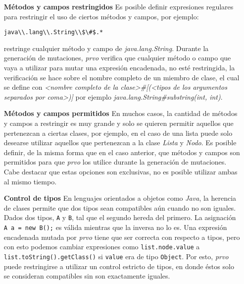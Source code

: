 \begin{enumerate}[leftmargin=.75cm,align=left]
	\item[\textbf{M\'etodos y campos restringidos}] Es posible definir expresiones regulares para restringir el uso de ciertos m\'etodos y campos, por ejemplo:
	\begin{lstlisting}[mathescape=true]
	java\\.lang\\.String\\$\#$.*
	\end{lstlisting}
	restringe cualquier m\'etodo y campo de \emph{java.lang.String}. Durante la generaci\'on de mutaciones, \emph{prvo} verifica que cualquier m\'etodo o campo que vaya a utilizar para mutar una expresi\'on encadenada, no est\'e restringida, la verificaci\'on se hace sobre el nombre completo de un miembro de clase, el cual se define con \emph{<nombre completo de la clase>\#<nombre del miembro>[(<tipos de los argumentos separados por coma>)]} por ejemplo \emph{java.lang.String\#substring(int, int)}.
	
	\item[\textbf{M\'etodos y campos permitidos}] En muchos casos, la cantidad de m\'etodos y campos a restringir es muy grande y solo se quieren permitir aquellos que pertenezcan a ciertas clases, por ejemplo, en el caso de una lista puede solo desearse utilizar aquellos que pertenezcan a la clase \emph{Lista} y \emph{Nodo}. Es posible definir, de la misma forma que en el caso anterior, que m\'etodos y campos son permitidos para que \emph{prvo} los utilice durante la generaci\'on de mutaciones. Cabe destacar que estas opciones son exclusivas, no es posible utilizar ambas al mismo tiempo.
	
	\item[\textbf{Control de tipos}] En lenguajes orientados a objetos como \emph{Java}, la herencia de clases permite que dos tipos sean compatibles a\'un cuando no son iguales. Dados dos tipos, \texttt{A} y \texttt{B}, tal que el segundo hereda del primero. La asignaci\'on \lstinline|A a = new B();| es v\'alida mientras que la inversa no lo es. Una expresi\'on encadenada mutada por \emph{prvo} tiene que ser correcta con respecto a tipos, pero con esto podemos cambiar expresiones como \lstinline|list.node.value| a \lstinline|list.toString().getClass()| si \texttt{value} era de tipo \texttt{Object}. Por esto, \emph{prvo} puede restringirse a utilizar un control estricto de tipos, en donde \'estos solo se consideran compatibles sin son exactamente iguales.
	

\end{enumerate}
